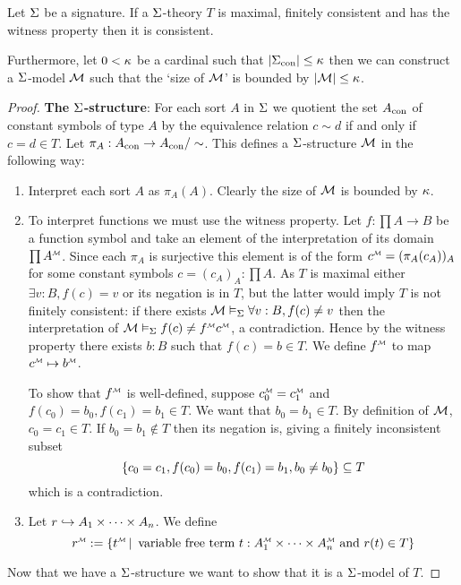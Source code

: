 \begin{lem}
    Let $\Sigma$ be a signature.
    If a $\Sigma$-theory $T$ is maximal, finitely consistent
    and has the witness property then it is consistent.

    Furthermore, let $0 < \kappa$ be a cardinal such that 
    $\left\vert {\Sigma}_\mathrm{con} \right\vert \leq \kappa$
    then we can construct a $\Sigma$-model $\mathcal{M}$ such that the 
    `size of $\mathcal{M}$' is bounded by $\left\vert \mathcal{M} \right\vert \leq \kappa$.
\end{lem}
\begin{proof}
    \textbf{The $\Sigma$-structure}: 
    For each sort $A$ in $\Sigma$ we quotient the set ${A}_\mathrm{con}$
    of constant symbols of type $A$ by the equivalence relation
    $c \sim d$ if and only if $c = d \in T$.
    Let $\pi_A : {A}_\mathrm{con} \to {A}_\mathrm{con} / \sim $.
    This defines a $\Sigma$-structure $\mathcal{M}$ in the following way:
    \begin{enumerate}
        \item Interpret each sort $A$ as $\pi_A(A)$.
            Clearly the size of $\mathcal{M}$ is bounded by $\kappa$.
        \item To interpret functions we must use the witness property.
        Let $f : \prod A \to B$ be a function symbol and take
        an element of the interpretation of its domain $\prod \mmintp{A}$.
        Since each $\pi_A$ is surjective this element is of the form
        $\mmintp{c} = (\pi_{A}(c_A))_A$ for some
        constant symbols $c = (c_A)_A : \prod A$.
        As $T$ is maximal either $\exists v : B, f(c) = v$ 
        or its negation is in $T$,
        but the latter would imply $T$ is not finitely consistent:
        if there exists $\mathcal{M} \vDash_{\Sigma} \forall v : B, f(c) \ne v$ then 
        the interpretation of $\MM \modelsi f(c) \ne \mmintp{f}\mmintp{c}$,
        a contradiction.
        Hence by the witness property there exists $b : B$ such that 
        $f(c) = b \in T$.
        We define $\mmintp{f}$ to map $\mmintp{c} \mapsto \mmintp{b}$.
        
        To show that $\mmintp{f}$ is well-defined,
        suppose $\mmintp{c_0} = \mmintp{c_1}$ and
        $f(c_0) = b_0, f(c_1) = b_1 \in T$.
        We want that $b_0 = b_1 \in T$.
        By definition of $\mathcal{M}$, $c_0 = c_1 \in T$.
        If $b_0 = b_1 \notin T$ then its negation is, 
        giving a finitely inconsistent subset 
        \[\left\{c_0 = c_1, f(c_0) = b_0, f(c_1) = b_1, b_0 \ne b_0\right\} \subseteq T\]
        which is a contradiction.
        \item Let $r \hookrightarrow A_1 \times \dots \times A_n$. 
        We define 
        \[
            \mmintp{r} := 
            \set{\mmintp{t} \st \text{ variable free term } 
            t : \mmintp{A_1} \tdt \mmintp{A_n} 
            \text{ and }
            r(t) \in T}
        \]
    \end{enumerate}
    Now that we have a $\Sigma$-structure
    we want to show that it is a $\Sigma$-model of $T$.


\end{proof}
